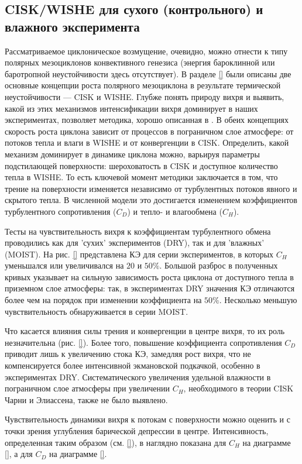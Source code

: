 \documentclass[12pt,a4paper]{report}
\begin{document}
\subsection{CISK/WISHE для сухого (контрольного) и влажного эксперимента}
\label{sec:res:wishe}
Рассматриваемое циклоническое возмущение, очевидно, можно отнести к типу полярных мезоциклонов конвективного генезиса (энергия бароклинной или баротропной неустойчивости  здесь отсутствует). В разделе \ref{} были описаны две основные концепции роста полярного мезоциклона в результате термической неустойчивости --- CISK и WISHE. Глубже понять природу вихря и выявить, какой из этих механизмов интенсификации вихря доминирует в наших экспериментах, позволяет методика, хорошо описанная в \citep{CraigGray1996}. В обеих концепциях скорость роста циклона зависит от процессов в пограничном слое атмосфере: от потоков тепла и влаги в WISHE и от конвергенции в CISK. Определить, какой механизм доминирует в динамике циклона можно, варьируя параметры подстилающей поверхности: шероховатость в CISK и доступное количество тепла в WISHE. То есть ключевой момент методики заключается в том, что трение на поверхности изменяется независимо от турбулентных потоков явного и скрытого тепла. В численной модели это достигается изменением коэффициентов турбулентного сопротивления ($C_D$) и тепло- и влагообмена ($C_H$).

Тесты на чувствительность вихря к коэффициентам турбулентного обмена проводились как для 'сухих' экспериментов (DRY), так и для 'влажных' (MOIST). На рис. \ref{} представлена КЭ для серии экспериментов, в которых $C_H$ уменьшался или увеличивался на $20$ и $50\%$. Большой разброс в полученных кривых указывает на сильную зависимость роста циклона от доступного тепла в приземном слое атмосферы: так, в экспериментах DRY значения КЭ отличаются более чем на порядок при изменении коэффициента на $50\%$. Несколько меньшую чувствительность обнаруживается в серии MOIST.

Что касается влияния силы трения и конвергенции в центре вихря, то их роль незначительна (рис. \ref{}). Более того, повышение коэффициента сопротивления $C_D$ приводит лишь к увеличению стока КЭ, замедляя рост вихря, что не компенсируется более интенсивной экмановской подкачкой, особенно в экспериментах DRY. Систематического увеличения удельной влажности в пограничном слое атмосферы при увеличении $C_H$, необходимого в теории CISK Чарни и Элиассена, также не было выявлено.

Чувствительность динамики вихря к потокам с поверхности можно оценить и с точки зрения углубления барической депрессии в центре. Интенсивность, определенная таким образом (см. \ref{}), в наглядно показана для $C_H$  на диаграмме \ref{}, а для $C_D$  на диаграмме \ref{}.
\end{document}
